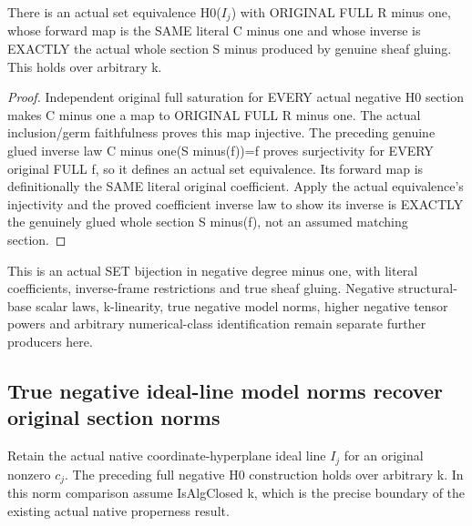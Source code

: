 \begin{theorem}
\label{thm:seven-native-original-negative-h0}
\leanok
There is an actual set equivalence H0($I_j$) with ORIGINAL FULL R minus
one, whose forward map is the SAME literal C minus one and whose inverse
is EXACTLY the actual whole section S minus produced by genuine sheaf
gluing. This holds over arbitrary k.
\end{theorem}
\begin{proof}
Independent original full saturation for EVERY actual negative H0
section makes C minus one a map to ORIGINAL FULL R minus one. The
actual inclusion/germ faithfulness proves this map injective. The
preceding genuine glued inverse law C minus one(S minus(f))=f proves
surjectivity for EVERY original FULL f, so it defines an actual set
equivalence. Its forward map is definitionally the SAME literal original
coefficient. Apply the actual equivalence's injectivity and the proved
coefficient inverse law to show its inverse is EXACTLY the genuinely
glued whole section S minus(f), not an assumed matching section.
\end{proof}

This is an actual SET bijection in negative degree minus one, with
literal coefficients, inverse-frame restrictions and true sheaf gluing.
Negative structural-base scalar laws, k-linearity, true negative model
norms, higher negative tensor powers and arbitrary numerical-class
identification remain separate further producers here.

\subsection{True negative ideal-line model norms recover original section norms}
Retain the actual native coordinate-hyperplane ideal line $I_j$ for an
original nonzero $c_j$. The preceding full negative H0 construction holds
over arbitrary k. In this norm comparison assume IsAlgClosed k, which
is the precise boundary of the existing actual native properness result.

